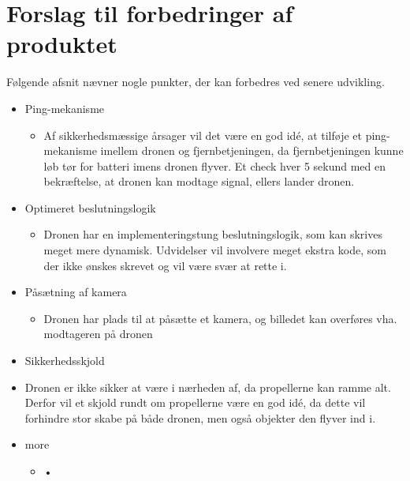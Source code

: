 \documentclass[Main]{subfiles}
\begin{document}
\section{Forslag til forbedringer af produktet}

Følgende afsnit nævner nogle punkter, der kan forbedres ved senere udvikling.

\begin{itemize}
\item Ping-mekanisme
\vspace{-10pt}
	\begin{itemize}
	\item Af sikkerhedsmæssige årsager vil det være en god idé, at tilføje et ping-mekanisme imellem dronen og fjernbetjeningen, da fjernbetjeningen kunne løb tør for batteri imens dronen flyver. 
	Et check hver 5 sekund med en bekræftelse, at dronen kan modtage signal, ellers lander dronen.
	\end{itemize}

\item Optimeret beslutningslogik
\vspace{-10pt}
	\begin{itemize}
	\item Dronen har en implementeringstung beslutningslogik, som kan skrives meget mere dynamisk. Udvidelser vil involvere meget ekstra kode, som der ikke ønskes skrevet og vil være svær at rette i.
	\end{itemize}
	
\item Påsætning af kamera
\vspace{-10pt}
	\begin{itemize}
	\item Dronen har plads til at påsætte et kamera, og billedet kan overføres vha. modtageren på dronen
	\end{itemize}
	
\item Sikkerhedsskjold
\item[] Dronen er ikke sikker at være i nærheden af, da propellerne kan ramme alt.
Derfor vil et skjold rundt om propellerne være en god idé, da dette vil forhindre stor skabe på både dronen, men også objekter den flyver ind i.

\item more
\vspace{-10pt}
	\begin{itemize}
	\item •
	\end{itemize}

\end{itemize}
\end{document}

